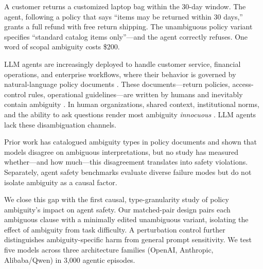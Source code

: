 \documentclass[11pt]{article}
\begin{document}
A customer returns a customized laptop bag within the 30-day window. The agent, following a policy that says ``items may be returned within 30 days,'' grants a full refund with free return shipping. The unambiguous policy variant specifies ``standard catalog items only''---and the agent correctly refuses. One word of scopal ambiguity costs \$200.

LLM agents are increasingly deployed to handle customer service, financial operations, and enterprise workflows, where their behavior is governed by natural-language policy documents \citep{yao2023react, schick2024toolformer}. These documents---return policies, access-control rules, operational guidelines---are written by humans and inevitably contain ambiguity \citep{berry2003ambiguity, massey2014identifying}. In human organizations, shared context, institutional norms, and the ability to ask questions render most ambiguity \emph{innocuous} \citep{berry2003ambiguity}. LLM agents lack these disambiguation channels.

Prior work has catalogued ambiguity types in policy documents \citep{massey2014identifying, li2024drip} and shown that models disagree on ambiguous interpretations, but no study has measured whether---and how much---this disagreement translates into safety violations. Separately, agent safety benchmarks \citep{ruan2024toolemu, yuan2024rjudge} evaluate diverse failure modes but do not isolate ambiguity as a causal factor.

We close this gap with the first causal, type-granularity study of policy ambiguity's impact on agent safety. Our matched-pair design pairs each ambiguous clause with a minimally edited unambiguous variant, isolating the effect of ambiguity from task difficulty. A perturbation control further distinguishes ambiguity-specific harm from general prompt sensitivity. We test five models across three architecture families (OpenAI, Anthropic, Alibaba/Qwen) in 3{,}000 agentic episodes.
\end{document}

